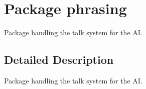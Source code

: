 \hypertarget{namespacephrasing}{\section{Package phrasing}
\label{namespacephrasing}
}


Package handling the talk system for the A\-I.  




\subsection{Detailed Description}
Package handling the talk system for the A\-I. 